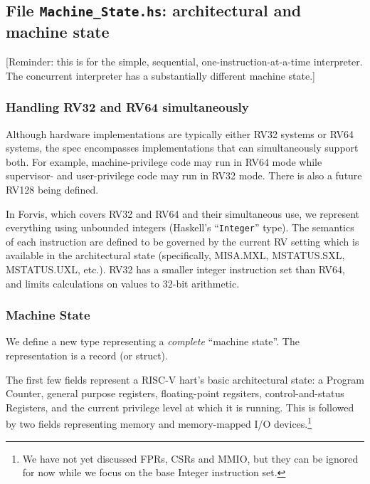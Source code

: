 \documentclass[11pt]{article}
\begin{document}

\subsection{File {\tt Machine\_State.hs}: architectural and machine state}

\label{sec_machine_state}

[Reminder: this is for the simple, sequential,
one-instruction-at-a-time interpreter.  The concurrent interpreter has
a substantially different machine state.]


\subsubsection{Handling RV32 and RV64 simultaneously}

Although hardware implementations are typically either RV32 systems or
RV64 systems, the spec encompasses implementations that can
simultaneously support both.  For example, machine-privilege code may
run in RV64 mode while supervisor- and user-privilege code may run in
RV32 mode.  There is also a future RV128 being defined.

In Forvis, which covers RV32 and RV64 and their simultaneous use, we
represent everything using unbounded integers (Haskell's
``\verb|Integer|'' type).  The semantics of each instruction are
defined to be governed by the current RV setting which is available in
the architectural state (specifically, MISA.MXL, MSTATUS.SXL,
MSTATUS.UXL, etc.).  RV32 has a smaller integer instruction set than
RV64, and limits calculations on values to 32-bit arithmetic.


\subsubsection{Machine State}

We define a new type representing a \emph{complete} ``machine state''.
The representation is a record (or struct).



The first few fields represent a RISC-V hart's basic architectural
state: a Program Counter, general purpose registers, floating-point
regsiters, control-and-status Registers, and the current privilege
level at which it is running. This is followed by two fields
representing memory and memory-mapped I/O devices.\footnote{We have
not yet discussed FPRs, CSRs and MMIO, but they can be ignored for now
while we focus on the base Integer instruction set.}
\end{document}
